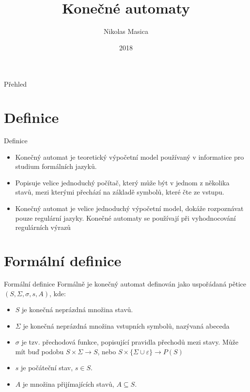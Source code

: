 \documentclass[10pt, hyperref={unicode}]{beamer}
\title{Konečné automaty}
\author{Nikolas Masica}
\institute{VUT FIT}
\date{2018}
\begin{document}
\maketitle
\begin{frame}{Přehled}
	\tableofcontents
\end{frame}

\section{Definice}

\begin{frame}{Definice}
\begin{itemize}
    \item Konečný automat je teoretický výpočetní model používaný v informatice pro studium formálních jazyků.
    \item Popisuje velice jednoduchý počítač, který může být v jednom z několika stavů, mezi kterými přechází na základě symbolů, které čte ze vstupu.
    \item Konečný automat je velice jednoduchý výpočetní model, dokáže rozpoznávat pouze regulární jazyky. Konečné automaty se používají při vyhodnocování regulárních výrazů
\end{itemize}
\end{frame}

\section{Formální definice}
\begin{frame}{Formální definice}
Formálně je konečný automat definován jako uspořádaná pětice $(S,\Sigma,\sigma ,s,A)$, kde:
\begin{itemize}
    \item $S$ je konečná neprázdná množina stavů.
    \item $\Sigma$ je konečná neprázdná množina vstupních symbolů, nazývaná abeceda
    \item $\sigma$ je tzv. přechodová funkce, popisující pravidla přechodů mezi stavy. Může mít buď podobu $S \times \Sigma \rightarrow S$, nebo $S \times \{\Sigma \cup \varepsilon \} \rightarrow P(S)$
    \item $s$ je počáteční stav, $s \in S$.
    \item $A$ je množina přijímajících stavů, $A \subseteq S$.
\end{itemize}
\end{frame}
\end{document}
